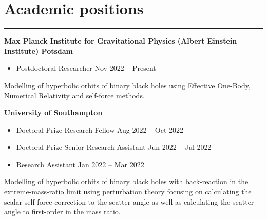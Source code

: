 \documentclass[10.5pt, oneside]{article}   	%
\begin{document}
 
 
\begin{center}
\huge
\href{mailto:oliver.long@aei.mpg.de}{} \:
\textcolor{Orcidcolour}{\href{https://orcid.org/0000-0002-3897-9272}{}} \:
\textcolor{RGcolour}{\href{https://www.researchgate.net/profile/Oliver-Long-3}{}} \:
\textcolor{LIcolour}{\href{https://www.linkedin.com/in/oliverflong/}{}} \:
\href{https://scholar.google.com/citations?user=92pSUO0AAAAJ&hl=en}{} \:
\href{https://oliverlong.info}{}
\end{center}

 \vspace{1mm}


{\color{Sectioncolour}
\section*{Academic positions}
\vspace{-3mm}
\noindent\rule{\linewidth}{0.6pt}}

\textbf{Max Planck Institute for Gravitational Physics (Albert Einstein Institute) Potsdam} \\
\vspace{-5mm}
\begin{itemize}
\item Postdoctoral Researcher \hfill Nov 2022 -- Present
\end{itemize}
Modelling of hyperbolic orbits of binary black holes using Effective One-Body, Numerical Relativity and self-force methods.

\textbf{University of Southampton} \\
\vspace{-5mm}
\begin{itemize}
\item Doctoral Prize Research Fellow \hfill Aug 2022 -- Oct 2022
\item Doctoral Prize Senior Research Assistant \hfill Jun 2022 -- Jul 2022
\item Research Assistant \hfill Jan 2022 -- Mar 2022
\end{itemize}
Modelling of hyperbolic orbits of binary black holes with back-reaction in the extreme-mass-ratio limit using perturbation theory focusing on calculating the scalar self-force correction to the scatter angle as well as calculating the scatter angle to first-order in the mass ratio.
\end{document}
